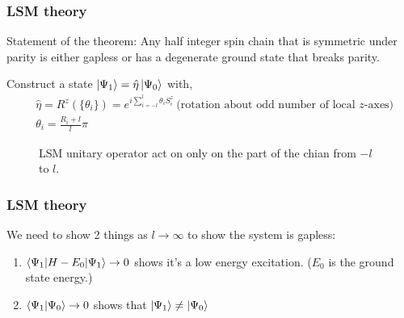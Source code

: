 \documentclass{beamer}
\begin{document}
\begin{frame}
    \frametitle{LSM theory}
    \begin{block}{Statement of the theorem:}
        Any half integer spin chain that is symmetric under parity is either gapless or has a degenerate ground state that breaks parity. 
    \end{block}
    \pause 

    Construct a state $\ket{\Psi_1} = \hat{\eta} \ket{\Psi_0}$ with, 
    \begin{align*}
        &\hat{\eta}  = R^z(\{ \theta_i\}) = e^{i\sum_{i = -l}^{l} \theta_i S^z_i} \ \text{(rotation about odd number of local $z$-axes)} \nonumber \\ 
        &\theta_i = \frac{R_i+l}{l} \pi
    \end{align*}
    \begin{figure}[h]
        \centering
        \caption{LSM unitary operator act on only on the part of the chian from $-l$ to $l$.}
        \label{lsm_chain}
    \end{figure}

\end{frame}

\begin{frame}
    \frametitle{LSM theory}
    We need to show 2 things as $l \rightarrow \infty$ to show the system is gapless: 
    \begin{enumerate}
        \item $\braket{\Psi_1|H - E_0|\Psi_1} \rightarrow 0 $ shows it's a low energy excitation. ($E_0$ is the ground state energy.) 
        \item $\braket{\Psi_1|\Psi_0} \rightarrow 0 $ shows that $\ket{\Psi_1} \neq \ket{\Psi_0}$ 
    \end{enumerate}
\end{frame}
\end{document}
